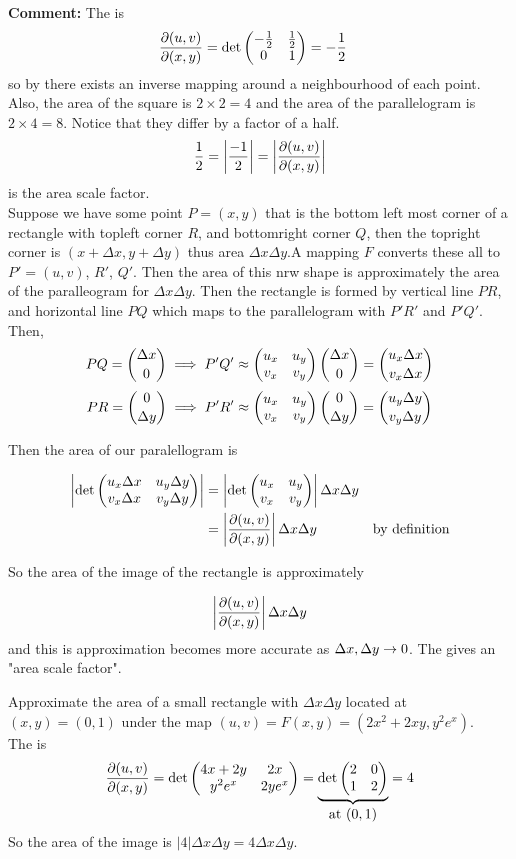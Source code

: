 \documentclass[english, 11pt]{article}
\begin{document}
\textbf{Comment:} The  is
\begin{align*}
  \frac{\partial(u,v)}{\partial(x,y)} & = \det \left( \begin{matrix} -\frac{1}{2} & \frac{1}{2} \\ 0 & 1 \end{matrix} \right) = -\frac{1}{2}
\end{align*}
so by  there exists an inverse mapping around a neighbourhood of each point. Also, the area of the square is $2\times 2 = 4$ and the area of the parallelogram is $2\times 4 = 8$. Notice that they differ by a factor of a half.
\[ \frac{1}{2} = \left| \frac{-1}{2} \right| = \left| \frac{\partial(u,v)}{\partial(x,y)} \right| \]
is the area scale factor. \\

Suppose we have some point $P =(x,y)$ that is the bottom left most corner of a rectangle with topleft corner $R$, and bottomright corner $Q$, then the topright corner is $(x + \Delta x, y + \Delta y)$ thus area $\Delta x \Delta y$.A mapping $F$ converts these all to $P' = (u,v)$, $R'$, $Q'$. Then the area of this nrw shape is approximately the area of the paralleogram for $\Delta x \Delta y$. Then the rectangle is formed by vertical line $PR$, and horizontal line $PQ$ which maps to the parallelogram with $P'R'$ and $P'Q'$. Then,
\[ PQ = {\Delta x \choose 0} \implies P'Q' \approx \left( \begin{matrix} u_x & u_y \\ v_x & v_y \end{matrix} \right) {\Delta x \choose 0} = {u_x \Delta x \choose v_x \Delta x} \]
\[ PR = {0 \choose \Delta y} \implies P'R' \approx \left( \begin{matrix} u_x & u_y \\ v_x & v_y \end{matrix} \right) {0 \choose \Delta y} = {u_y \Delta y \choose v_y \Delta y} \]

Then the area of our paralellogram is

\begin{align*}
  \left| \det \left( \begin{matrix} u_x\Delta x & u_y\Delta y \\ v_x\Delta x & v_y \Delta y \end{matrix} \right) \right| & = \left| \det \left( \begin{matrix} u_x & u_y \\ v_x & v_y \end{matrix} \right) \right|\Delta x \Delta y \\
  & = \left| \frac{\partial(u,v)}{\partial(x,y)} \right| \Delta x \Delta y & \mbox{by definition}
\end{align*}

So the area of the image of the rectangle is approximately

\[ \left| \frac{\partial(u,v)}{\partial(x,y)} \right| \Delta x \Delta y \]
and this is approximation becomes more accurate as $\Delta x, \Delta y \rightarrow 0$. The  gives an "area scale factor".

\begin{exmp}
  Approximate the area of a small rectangle with $\Delta x \Delta y$ located at $(x,y) = (0,1)$ under the map $(u,v) = F(x,y) = (2x^2 + 2xy, y^2e^x)$. \\

  The  is 
  \[ \frac{\partial(u,v)}{\partial(x,y)} = \det \left( \begin{matrix} 4x + 2y & 2x \\ y^2e^x & 2ye^x \end{matrix} \right) = \underbrace{\det \left( \begin{matrix} 2 & 0 \\ 1 & 2 \end{matrix} \right)}_{\mbox{at $(0,1)$}} = 4 \]
  So the area of the image is $|4|\Delta x \Delta y = 4 \Delta x \Delta y$.
\end{exmp}
\end{document}
